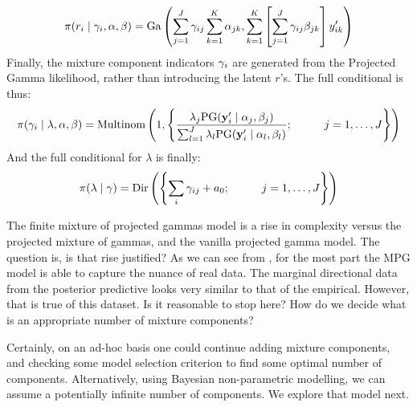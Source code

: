 \begin{equation}
\pi(r_i\mid{\bf \gamma}_i, {\bf \alpha}, {\bf \beta}) = \text{Ga}\left(\sum_{j = 1}^J\gamma_{ij}\sum_{k = 1}^K\alpha_{jk}, \sum_{k = 1}^K\left[\sum_{j = 1}^J\gamma_{ij}\beta_{jk}\right]y_{ik}^{\prime}\right)
\end{equation}
Finally, the mixture component indicators ${\bf \gamma}_i$ are generated from
  the Projected Gamma likelihood, rather than introducing the latent $r$'s.
  The full conditional is thus:
\begin{equation}
\pi({\bf \gamma}_i\mid {\bf \lambda},{\bf \alpha},{\bf \beta}) = \text{Multinom}\left(1, \left\lbrace\frac{\lambda_j\text{PG}({\bf y}_i^{\prime}\mid{\bf \alpha}_j,{\bf \beta}_j)}{\sum_{l = 1}^J\lambda_l\text{PG}({\bf y}_i^{\prime}\mid{\bf \alpha}_l,{\bf \beta}_l)}; \hspace{1cm}j = 1,\ldots,J\right\rbrace\right)
\end{equation}
And the full conditional for $\lambda$ is finally:
\begin{equation}
\pi({\bf \lambda}\mid{\bf \gamma}) = \text{Dir}\left(
\left\lbrace \sum_i\gamma_{ij} + a_0; \hspace{1cm}j = 1,\ldots,J\right\rbrace\right)
\end{equation}

The finite mixture of projected gammas model is a rise in complexity versus
  the projected mixture of gammas, and the vanilla projected gamma model.  The
  question is, is that rise justified?  As we can see from ,
  for the most part the MPG model is able to capture the nuance of real data.
  The marginal directional data from the posterior predictive looks very similar
  to that of the empirical.  However, that is true of this dataset.  Is it
  reasonable to stop here?  How do we decide what is an appropriate number of
  mixture components?

Certainly, on an ad-hoc basis one could continue adding mixture components,
  and checking some model selection criterion to find some optimal number of
  components.  Alternatively, using Bayesian non-parametric modelling, we can
  assume a potentially infinite number of components.  We explore that model
  next.









